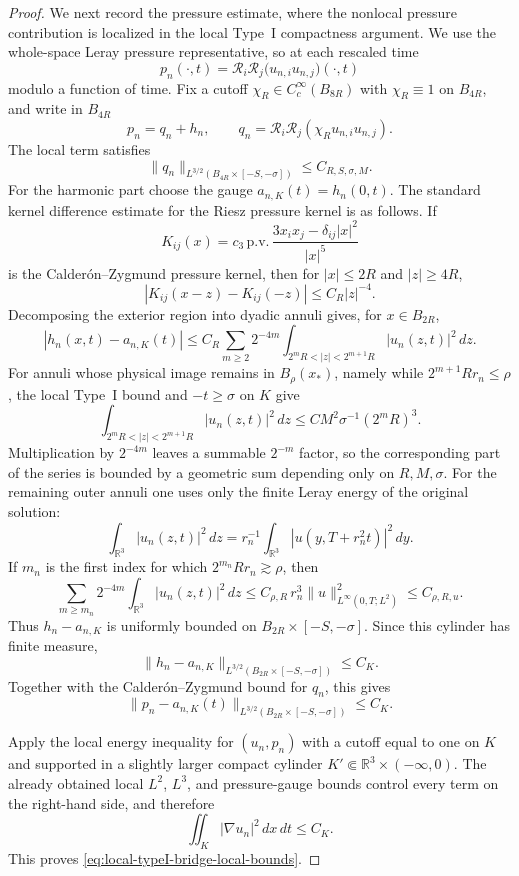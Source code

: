\documentclass[11pt]{amsart}
\numberwithin{equation}{section}
\theoremstyle{plain}
\theoremstyle{definition}
\theoremstyle{remark}
\newcommand{\R}{\mathbb R}
\begin{document}
\begin{proof}
We next record the pressure estimate, where the nonlocal pressure contribution
is localized in the local Type~I compactness argument.  We use the whole-space
Leray pressure representative, so at each rescaled time
\[
   p_n(\cdot,t)=\mathcal R_i\mathcal R_j
      \bigl(u_{n,i}u_{n,j}\bigr)(\cdot,t)
\]
modulo a function of time.  Fix a cutoff
\(\chi_R\in C_c^\infty(B_{8R})\) with \(\chi_R\equiv1\) on \(B_{4R}\), and
write in \(B_{4R}\)
\[
   p_n=q_n+h_n,\qquad
   q_n=\mathcal R_i\mathcal R_j(\chi_R u_{n,i}u_{n,j}).
\]
The local term satisfies
\[
   \|q_n\|_{L^{3/2}(B_{4R}\times[-S,-\sigma])}
   \le C_{R,S,\sigma,M}.
\]
For the harmonic part choose the gauge \(a_{n,K}(t)=h_n(0,t)\).  The standard
kernel difference estimate for the Riesz pressure kernel is as follows.  If
\[
   K_{ij}(x)=c_3\,\mathrm{p.v.}\,
      \frac{3x_ix_j-\delta_{ij}|x|^2}{|x|^5}
\]
is the Calder\'on--Zygmund pressure kernel, then for \(|x|\le2R\) and
\(|z|\ge4R\),
\[
   |K_{ij}(x-z)-K_{ij}(-z)|\le C_R|z|^{-4}.
\]
Decomposing the exterior region into dyadic annuli gives, for \(x\in B_{2R}\),
\[
   |h_n(x,t)-a_{n,K}(t)|
   \le
   C_R\sum_{m\ge2}2^{-4m}
   \int_{2^mR<|z|<2^{m+1}R}|u_n(z,t)|^2\,dz .
\]
For annuli whose physical image remains in \(B_\rho(x_*)\), namely while
\(2^{m+1}Rr_n\le\rho\), the local Type~I bound and \(-t\ge\sigma\) on \(K\)
give
\[
   \int_{2^mR<|z|<2^{m+1}R}|u_n(z,t)|^2\,dz
   \le C M^2\sigma^{-1}(2^mR)^3 .
\]
Multiplication by \(2^{-4m}\) leaves a summable \(2^{-m}\) factor, so the
corresponding part of the series is bounded by a geometric sum depending only
on \(R,M,\sigma\).  For the remaining outer annuli one uses only the finite
Leray energy of the original solution:
\[
   \int_{\R^3}|u_n(z,t)|^2\,dz
   =r_n^{-1}\int_{\R^3}|u(y,T+r_n^2t)|^2\,dy .
\]
If \(m_n\) is the first index for which \(2^{m_n}Rr_n\gtrsim\rho\), then
\[
   \sum_{m\ge m_n}2^{-4m}\int_{\R^3}|u_n(z,t)|^2\,dz
   \le
   C_{\rho,R}\,r_n^3\|u\|_{L^\infty(0,T;L^2)}^2
   \le C_{\rho,R,u}.
\]
Thus \(h_n-a_{n,K}\) is uniformly bounded on
\(B_{2R}\times[-S,-\sigma]\).  Since this cylinder has finite measure,
\[
   \|h_n-a_{n,K}\|_{L^{3/2}(B_{2R}\times[-S,-\sigma])}
   \le C_K .
\]
Together with the Calder\'on--Zygmund bound for \(q_n\), this gives
\[
   \|p_n-a_{n,K}(t)\|_{L^{3/2}(B_{2R}\times[-S,-\sigma])}
   \le C_K .
\]

Apply the local energy inequality for \((u_n,p_n)\) with a cutoff equal to one
on \(K\) and supported in a slightly larger compact cylinder
\(K'\Subset\R^3\times(-\infty,0)\).  The already obtained local \(L^2\),
\(L^3\), and pressure-gauge bounds control every term on the right-hand side,
and therefore
\[
   \iint_K |\nabla u_n|^2\,dx\,dt\le C_K .
\]
This proves \eqref{eq:local-typeI-bridge-local-bounds}.


\end{proof}
\end{document}
